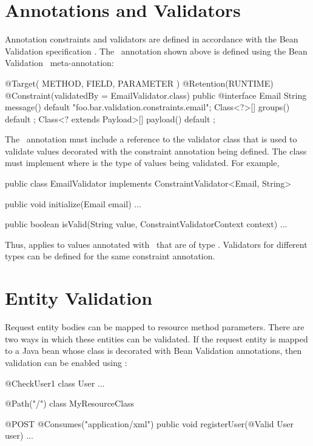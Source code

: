 \section{Annotations and Validators}

Annotation constraints and validators are defined in accordance with the Bean Validation specification \cite{bv11}. The \Email\ annotation shown above is defined using the Bean Validation \Constraint\ meta-annotation:

\begin{listing}{1}
@Target( { METHOD, FIELD, PARAMETER })
@Retention(RUNTIME)
@Constraint(validatedBy = EmailValidator.class)
public @interface Email {
    String message() default "{foo.bar.validation.constraints.email}"; 
    Class<?>[] groups() default {};
    Class<? extends Payload>[] payload() default {};
}
\end{listing}

The \Constraint\ annotation must include a reference to the validator class that is used to validate values decorated with the constraint annotation being defined. The  class must implement  where  is the type of values being validated. For example, 

\begin{listing}{1}
public class EmailValidator implements ConstraintValidator<Email, String> {
    public void initialize(Email email) { 
        ...
    }

    public boolean isValid(String value, ConstraintValidatorContext context) {
        ...
    }
}
\end{listing}

Thus,  applies to values annotated with \Email\ that are of type . Validators for different types can be defined for the same constraint annotation. 

\section{Entity Validation}

Request entity bodies can be mapped to resource method parameters. There are two ways in which these entities can be validated. If the request entity is mapped to a Java bean whose class is decorated with Bean Validation annotations, then validation can be enabled using \Valid:

\begin{listing}{1}
@CheckUser1
class User { ... }

@Path("/")
class MyResourceClass {

    @POST
    @Consumes("application/xml")
    public void registerUser(@Valid User user) {
        ...
    }
}
\end{listing}

